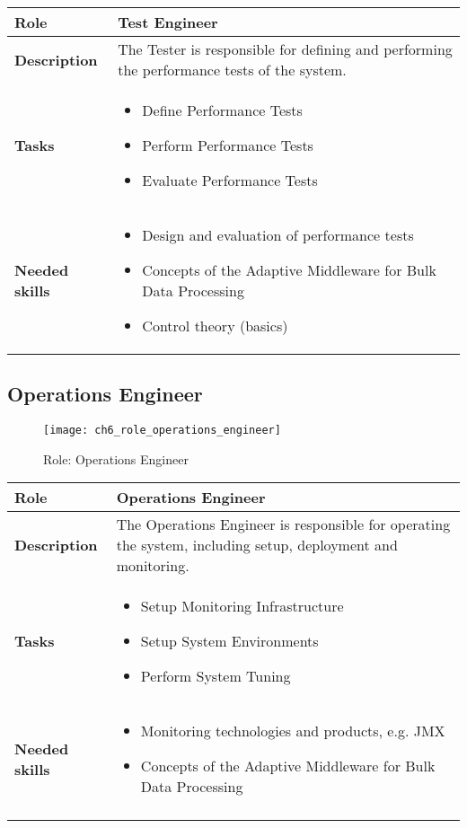 \begin{tabularx}{\textwidth}{@{} l X @{}}
	\caption{Test Engineer} \label{table:ch6_Role_Test_Engineer}\\
	\toprule
	\bfseries Role & Test Engineer\\
	\midrule
	\bfseries Description & The Tester is responsible for defining and performing the performance tests of the system.\\
	\midrule
	\bfseries Tasks & 
	\begin{itemize}
		\item Define Performance Tests
		\item Perform Performance Tests
		\item Evaluate Performance Tests
	\end{itemize}
	\\
	\midrule
	\bfseries Needed skills &
	\begin{itemize}
		\item Design and evaluation of performance tests
		\item Concepts of the Adaptive Middleware for Bulk Data Processing
		\item Control theory (basics)
	\end{itemize}
	\\
	\bottomrule
\end{tabularx}


\subsection{Operations Engineer}
\begin{figure}[htpb] \centering 
	\texttt{[image: ch6\_role\_operations\_engineer]} 
	\caption{Role: Operations Engineer} 
	\label{fig:ch6_role_operations_engineer} 
\end{figure}

\begin{tabularx}{\textwidth}{@{} l X @{}}
	\caption{Operations Engineer}\label{table:ch6_Role_Operations_Engineer}\\
	\toprule
	\bfseries Role & Operations Engineer\\
	\midrule
	\bfseries Description & The Operations Engineer is responsible for operating the system, including setup, deployment and monitoring.\\
	\midrule
	\bfseries Tasks & 
	\begin{itemize}
		\item Setup Monitoring Infrastructure
		\item Setup System Environments
		\item Perform System Tuning
	\end{itemize}
	\\
	\midrule
	\bfseries Needed skills &
	\begin{itemize}
		\item Monitoring technologies and products, e.g. \ac{JMX}
		\item Concepts of the Adaptive Middleware for Bulk Data Processing
	\end{itemize}
	\\
	\endline
\end{tabularx}


